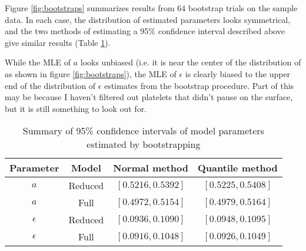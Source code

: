 \documentclass{article}
\begin{document}
Figure \ref{fig:bootstraps} summarizes results from 64 bootstrap
trials on the sample data. In each case, the distribution of estimated
parameters looks symmetrical, and the two methods of estimating a 95\%
confidence interval described above give similar results (Table
\ref{tab:conf-int}).

While the MLE of $a$ looks unbiased (i.e. it is near the center of the
distribution of $a$s shown in figure \ref{fig:bootstraps}), the MLE of
$\epsilon$ is clearly biased to the upper end of the distribution of
$\epsilon$ estimates from the bootstrap procedure. Part of this may be
because I haven't filtered out platelets that didn't pause on the
surface, but it is still something to look out for. 

\begin{table}
  \centering
  \begin{tabular}{cccc}
    \hline
    Parameter & Model & Normal method & Quantile method \\
    \hline
    $a$ & Reduced & $[0.5216, 0.5392]$ & $[0.5225, 0.5408]$ \\
    $a$ & Full & $[0.4972, 0.5154]$ & $[0.4979, 0.5164]$ \\
    $\epsilon$ & Reduced & $[0.0936, 0.1090]$ & $[0.0948, 0.1095]$ \\
    $\epsilon$ & Full & $[0.0916, 0.1048]$ & $[0.0926, 0.1049]$\\
    \hline
  \end{tabular}
  \caption[Summary of confidence intervals]{Summary of 95\% confidence
    intervals of model parameters estimated by bootstrapping}
  \label{tab:conf-int}
\end{table}
\end{document}
